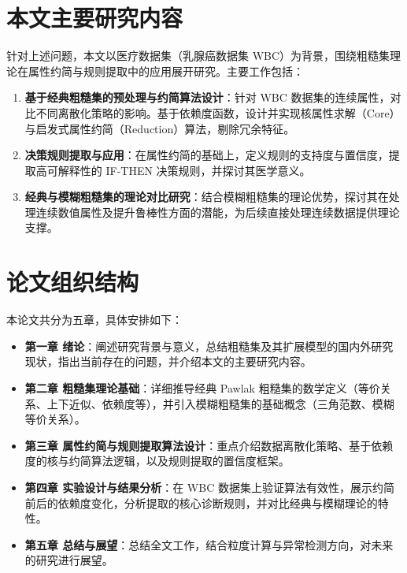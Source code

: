 \section{本文主要研究内容}

针对上述问题，本文以医疗数据集（乳腺癌数据集 WBC）为背景，围绕粗糙集理论在属性约简与规则提取中的应用展开研究。主要工作包括：
\begin{enumerate}
	\item \textbf{基于经典粗糙集的预处理与约简算法设计}：针对 WBC 数据集的连续属性，对比不同离散化策略的影响。基于依赖度函数，设计并实现核属性求解（Core）与启发式属性约简（Reduction）算法，剔除冗余特征。
	\item \textbf{决策规则提取与应用}：在属性约简的基础上，定义规则的支持度与置信度，提取高可解释性的 IF-THEN 决策规则，并探讨其医学意义。
	\item \textbf{经典与模糊粗糙集的理论对比研究}：结合模糊粗糙集的理论优势，探讨其在处理连续数值属性及提升鲁棒性方面的潜能，为后续直接处理连续数据提供理论支撑。
\end{enumerate}

\section{论文组织结构}

本论文共分为五章，具体安排如下：
\begin{itemize}
	\item \textbf{第一章 绪论}：阐述研究背景与意义，总结粗糙集及其扩展模型的国内外研究现状，指出当前存在的问题，并介绍本文的主要研究内容。
	\item \textbf{第二章 粗糙集理论基础}：详细推导经典 Pawlak 粗糙集的数学定义（等价关系、上下近似、依赖度等），并引入模糊粗糙集的基础概念（三角范数、模糊等价关系）。
	\item \textbf{第三章 属性约简与规则提取算法设计}：重点介绍数据离散化策略、基于依赖度的核与约简算法逻辑，以及规则提取的置信度框架。
	\item \textbf{第四章 实验设计与结果分析}：在 WBC 数据集上验证算法有效性，展示约简前后的依赖度变化，分析提取的核心诊断规则，并对比经典与模糊理论的特性。
	\item \textbf{第五章 总结与展望}：总结全文工作，结合粒度计算与异常检测方向，对未来的研究进行展望。
\end{itemize}